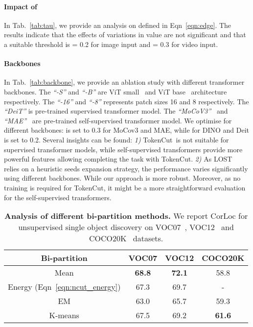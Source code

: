 \documentclass[twocolumn]{article}
\newcommand{\name} {TokenCut}
\begin{document}
\paragraph*{Impact of } In Tab.~\ref{tab:tau}, we provide an analysis on  defined in Eqn~\ref{eqn:edge}. The results indicate that the effects of variations in  value are not significant and that a suitable threshold is  = 0.2 for image input and  = 0.3 for video input. 

 





\paragraph*{Backbones}

In Tab.~\ref{tab:backbone}, we provide an ablation study with different transformer backbones. The \textit{``-S''} and \textit{``-B''} are ViT small~\cite{dosovitskiy2020image, caron2021emerging} and ViT base~\cite{dosovitskiy2020image, caron2021emerging} architecture respectively. The \textit{``-16''} and \textit{``-8''} represents patch sizes 16 and 8 respectively. The \textit{``DeiT''} is pre-trained supervised transformer model. The \textit{``MoCoV3''}~\cite{chen2021empirical} and \textit{``MAE''}~\cite{he2022masked} are pre-trained self-supervised transformer model. We optimise  for different backbones:  is set to 0.3 for MoCov3 and MAE, while for DINO and Deit  is set to 0.2. Several insights can be found: \textit{1)} \name~is not suitable for supervised transformer models, while self-supervised transformers provide more powerful features allowing completing the task with \name. \textit{2)} As LOST~\cite{simeoni2021localizing} relies on a heuristic seeds expansion strategy, the performance varies significantly using different backbones. While our approach is more robust. Moreover, as no training is required for \name, it might be a more straightforward evaluation for the self-supervised transformers. 



\begin{table}[!t]
	\begin{center}
	\caption{\textbf{Analysis of different bi-partition methods.} We report CorLoc for unsupervised single object discovery on VOC07~\cite{pascal-voc-2007}, VOC12~\cite{pascal-voc-2012} and COCO20K~\cite{lin2014microsoft,vo2020toward} datasets.}   
	
    \begin{tabular}{cccc}
    \toprule Bi-partition &
    VOC07 & VOC12 & COCO20K \\
    \midrule
    Mean        & \bf 68.8 & \bf 72.1 & 58.8 \\
    Energy (Eqn~\ref{eqn:ncut_energy}) & 67.3 & 69.7 & -\\
    EM          & 63.0 & 65.7 & 59.3 \\
    K-means      & 67.5 &  69.2 &  \bf 61.6  \\
    \bottomrule
    \end{tabular}
	\label{tab:partition}
	\end{center}
\end{table} 
\end{document}
